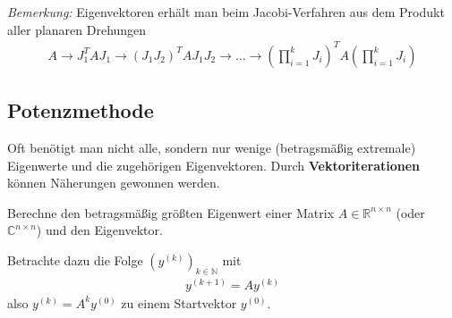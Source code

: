 \documentclass[%
a4paper,
11pt,		%
]
{scrartcl}
\newcommand{\R}{\mathbb{R}}
\newcommand{\C}{\mathbb{C}}
\theoremstyle{plain}
\theoremstyle{plain}
\theoremstyle{plain}
\theoremstyle{plain}
\begin{document}
\textit{Bemerkung:}
Eigenvektoren erhält man beim Jacobi-Verfahren aus dem Produkt aller planaren Drehungen
\begin{align*}
  A \to J_1^T A J_1 \to (J_1 J_2)^T A J_1 J_2 \to \ldots \to \left( \prod\limits_{i=1}^k J_i \right)^T A \left( \prod\limits_{i=1}^k J_i \right)
\end{align*}

\subsection{Potenzmethode}
\label{sub:Potenzmethode}

Oft benötigt man nicht alle, sondern nur wenige (betragsmäßig extremale) Eigenwerte und die zugehörigen Eigenvektoren. Durch \textbf{Vektoriterationen} können Näherungen gewonnen werden. 

Berechne den betragsmäßig größten Eigenwert einer Matrix $A \in \R^{n \times n}$ (oder $\C^{n \times n}$) und den Eigenvektor.

Betrachte dazu die Folge $\left( y^{(k)} \right)_{k \in \mathbb{N}}$ mit 
\begin{align*}
y^{(k+1)} = Ay^{(k)}
\end{align*}
also $y^{(k)} = A^k y^{(0)}$ zu einem Startvektor $y^{(0)}$.
\end{document}
